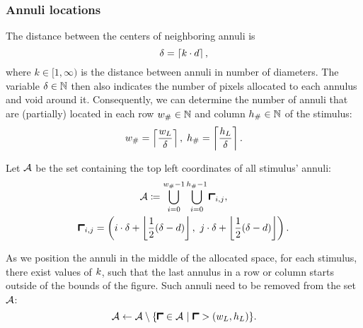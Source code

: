 \subsubsection{Annuli locations}
\label{sec:annuli-locations}

The distance between the centers of neighboring annuli is
\begin{equation}
    \delta = \left\lceil k \cdot d \right\rceil,
\end{equation}
where $k \in [1, \infty)$ is the distance between annuli in number of diameters.
The variable $\delta \in \mathbb{N}$ then also indicates the number of pixels allocated to each annulus and void around it. Consequently, we can determine the number of annuli that are (partially) located in each row $w_{\#} \in \mathbb{N}$ and column $h_{\#} \in \mathbb{N}$ of the stimulus:
\begin{equation}
    w_{\#} = \left\lceil \frac{w_L}{\delta} \right\rceil, \;
    h_{\#} = \left\lceil \frac{h_L}{\delta} \right\rceil. 
\end{equation}

Let $\mathcal{A}$ be the set containing the top left coordinates of all stimulus' annuli:
\begin{equation}
\begin{gathered}
    \annuliset  \coloneqq \bigcup_{i = 0}^{\repsinrow - 1} \bigcup_{i = 0}^{\repsincol - 1}
    \annstart_{i, j}, \\
    \annstart_{i, j} = \left( 
        i \cdot \anndist + \floor{ \frac{1}{2} (\anndist - \diam) }, \ 
        j \cdot \anndist + \floor{ \frac{1}{2} (\anndist - \diam) }
    \right).
\end{gathered}
\end{equation}

As we position the annuli in the middle of the allocated space, for each stimulus, there exist values of $k$, such that the last annulus in a row or column starts outside of the bounds of the figure. Such annuli need to be removed from the set $\mathcal{A}$:
\begin{equation}
    \annuliset \leftarrow \annuliset \setminus \{ \annstart \in \annuliset \ | \ \annstart > (\fullwidth, \fullheight) \}.
\end{equation}
